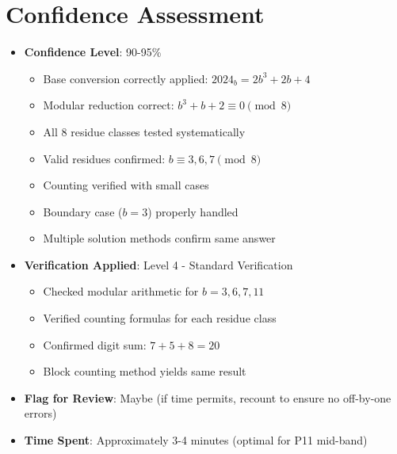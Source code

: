 \documentclass[11pt]{article}
\begin{document}
\section*{Confidence Assessment}
\begin{itemize}[leftmargin=*]
    \item \textbf{Confidence Level}: 90-95\%
    \begin{itemize}
        \item Base conversion correctly applied: $2024_b = 2b^3 + 2b + 4$
        \item Modular reduction correct: $b^3 + b + 2 \equiv 0 \pmod{8}$
        \item All 8 residue classes tested systematically
        \item Valid residues confirmed: $b \equiv 3, 6, 7 \pmod{8}$
        \item Counting verified with small cases
        \item Boundary case ($b = 3$) properly handled
        \item Multiple solution methods confirm same answer
    \end{itemize}
    
    \item \textbf{Verification Applied}: Level 4 - Standard Verification
    \begin{itemize}
        \item Checked modular arithmetic for $b = 3, 6, 7, 11$
        \item Verified counting formulas for each residue class
        \item Confirmed digit sum: $7 + 5 + 8 = 20$
        \item Block counting method yields same result
    \end{itemize}
    
    \item \textbf{Flag for Review}: Maybe (if time permits, recount to ensure no off-by-one errors)
    
    \item \textbf{Time Spent}: Approximately 3-4 minutes (optimal for P11 mid-band)
\end{itemize}
\end{document}
